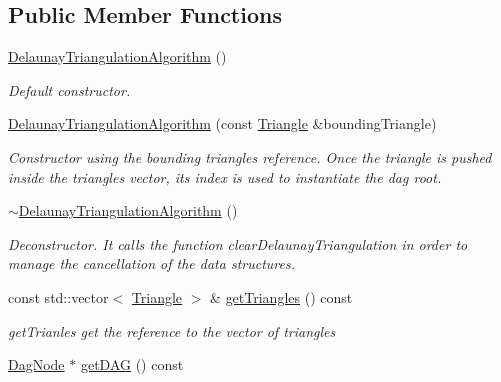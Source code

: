 \subsection*{Public Member Functions}
\begin{DoxyCompactItemize}
\item 
\mbox{\label{classDelaunayTriangulationAlgorithm_a2f39a9d3a69f8e8a9d446454a81152b8}} 
\hyperlink{classDelaunayTriangulationAlgorithm_a2f39a9d3a69f8e8a9d446454a81152b8}{Delaunay\+Triangulation\+Algorithm} ()
\begin{DoxyCompactList}\small\item\em Default constructor. \end{DoxyCompactList}\item 
\hyperlink{classDelaunayTriangulationAlgorithm_a91aee656e92987fafbadd7c43f2de179}{Delaunay\+Triangulation\+Algorithm} (const \hyperlink{classTriangle}{Triangle} \&bounding\+Triangle)
\begin{DoxyCompactList}\small\item\em Constructor using the bounding triangle\textquotesingle{}s reference. Once the triangle is pushed inside the triangles vector, its index is used to instantiate the dag root. \end{DoxyCompactList}\item 
\mbox{\label{classDelaunayTriangulationAlgorithm_a9ee6c85303df53b412890bf20df2dedb}} 
\hyperlink{classDelaunayTriangulationAlgorithm_a9ee6c85303df53b412890bf20df2dedb}{$\sim$\+Delaunay\+Triangulation\+Algorithm} ()
\begin{DoxyCompactList}\small\item\em Deconstructor. It calls the function clear\+Delaunay\+Triangulation in order to manage the cancellation of the data structures. \end{DoxyCompactList}\item 
const std\+::vector$<$ \hyperlink{classTriangle}{Triangle} $>$ \& \hyperlink{classDelaunayTriangulationAlgorithm_a56fe3edcfae8b23e2853bfb94ec87382}{get\+Triangles} () const
\begin{DoxyCompactList}\small\item\em get\+Trianles get the reference to the vector of triangles \end{DoxyCompactList}\item 
\hyperlink{classDagNode}{Dag\+Node} $\ast$ \hyperlink{classDelaunayTriangulationAlgorithm_adc738bca3922d9c21700ebaa62b52c4e}{get\+D\+AG} () const

\end{DoxyCompactItemize}
